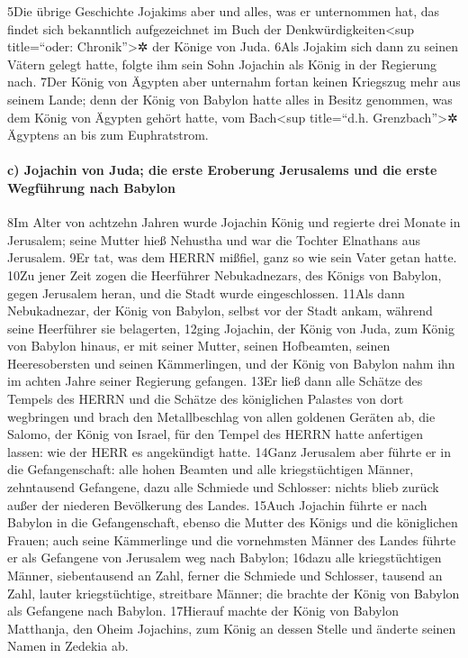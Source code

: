 5Die übrige Geschichte Jojakims aber und alles, was er unternommen hat,
das findet sich bekanntlich aufgezeichnet im Buch der
Denkwürdigkeiten\textless sup title=``oder: Chronik''\textgreater✲ der
Könige von Juda. 6Als Jojakim sich dann zu seinen Vätern gelegt hatte,
folgte ihm sein Sohn Jojachin als König in der Regierung nach. 7Der
König von Ägypten aber unternahm fortan keinen Kriegszug mehr aus seinem
Lande; denn der König von Babylon hatte alles in Besitz genommen, was
dem König von Ägypten gehört hatte, vom Bach\textless sup title=``d.h.
Grenzbach''\textgreater✲ Ägyptens an bis zum Euphratstrom.

\hypertarget{c-jojachin-von-juda-die-erste-eroberung-jerusalems-und-die-erste-wegfuxfchrung-nach-babylon}{%
\paragraph{c) Jojachin von Juda; die erste Eroberung Jerusalems und die
erste Wegführung nach
Babylon}\label{c-jojachin-von-juda-die-erste-eroberung-jerusalems-und-die-erste-wegfuxfchrung-nach-babylon}}

8Im Alter von achtzehn Jahren wurde Jojachin König und regierte drei
Monate in Jerusalem; seine Mutter hieß Nehustha und war die Tochter
Elnathans aus Jerusalem. 9Er tat, was dem HERRN mißfiel, ganz so wie
sein Vater getan hatte. 10Zu jener Zeit zogen die Heerführer
Nebukadnezars, des Königs von Babylon, gegen Jerusalem heran, und die
Stadt wurde eingeschlossen. 11Als dann Nebukadnezar, der König von
Babylon, selbst vor der Stadt ankam, während seine Heerführer sie
belagerten, 12ging Jojachin, der König von Juda, zum König von Babylon
hinaus, er mit seiner Mutter, seinen Hofbeamten, seinen Heeresobersten
und seinen Kämmerlingen, und der König von Babylon nahm ihn im achten
Jahre seiner Regierung gefangen. 13Er ließ dann alle Schätze des Tempels
des HERRN und die Schätze des königlichen Palastes von dort wegbringen
und brach den Metallbeschlag von allen goldenen Geräten ab, die Salomo,
der König von Israel, für den Tempel des HERRN hatte anfertigen lassen:
wie der HERR es angekündigt hatte. 14Ganz Jerusalem aber führte er in
die Gefangenschaft: alle hohen Beamten und alle kriegstüchtigen Männer,
zehntausend Gefangene, dazu alle Schmiede und Schlosser: nichts blieb
zurück außer der niederen Bevölkerung des Landes. 15Auch Jojachin führte
er nach Babylon in die Gefangenschaft, ebenso die Mutter des Königs und
die königlichen Frauen; auch seine Kämmerlinge und die vornehmsten
Männer des Landes führte er als Gefangene von Jerusalem weg nach
Babylon; 16dazu alle kriegstüchtigen Männer, siebentausend an Zahl,
ferner die Schmiede und Schlosser, tausend an Zahl, lauter
kriegstüchtige, streitbare Männer; die brachte der König von Babylon als
Gefangene nach Babylon. 17Hierauf machte der König von Babylon
Matthanja, den Oheim Jojachins, zum König an dessen Stelle und änderte
seinen Namen in Zedekia ab.

